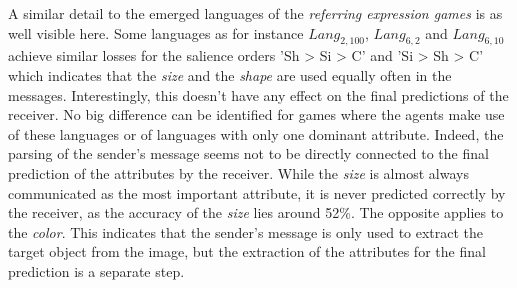 A similar detail to the emerged languages of the \emph{referring expression games} is as well visible here.
Some languages as for instance $Lang_{2,100}$, $Lang_{6,2}$ and $Lang_{6,10}$ achieve similar losses for the salience orders 'Sh > Si > C' and 'Si > Sh > C' which indicates that the \emph{size} and the \emph{shape} are used equally often in the messages.
Interestingly, this doesn't have any effect on the final predictions of the receiver.
No big difference can be identified for games where the agents make use of these languages or of languages with only one dominant attribute.
Indeed, the parsing of the sender's message seems not to be directly connected to the final prediction of the attributes by the receiver.
While the \emph{size} is almost always communicated as the most important attribute, it is never predicted correctly by the receiver, as the accuracy of the \emph{size} lies around 52\%.
The opposite applies to the \emph{color}.
This indicates that the sender's message is only used to extract the target object from the image, but the extraction of the attributes for the final prediction is a separate step.

